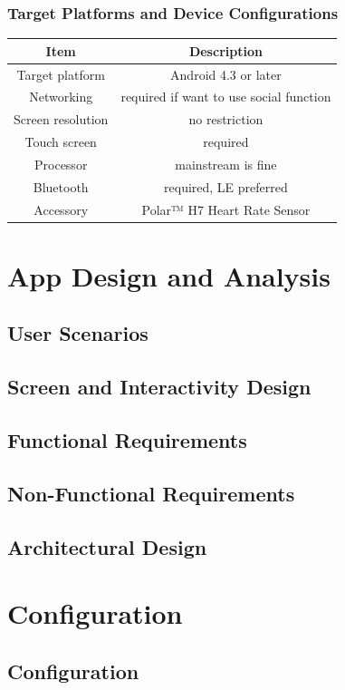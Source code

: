 \documentclass[10pt,a4paper,final,DIV=12]{scrartcl}
\begin{document}
\subsubsection{Target Platforms and Device Configurations}
\begin{tabular}{|c|c|}
\hline 
Item & Description \\ 
\hline 
Target platform & Android 4.3 or later \\
Networking & required if want to use social function \\
Screen resolution & no restriction \\
Touch screen & required \\
Processor & mainstream is fine \\
Bluetooth & required, LE preferred \\
Accessory & Polar™ H7 Heart Rate Sensor \\
\hline 
\end{tabular} 
\section{App Design and Analysis}
\subsection{User Scenarios}
	
\subsection{Screen and Interactivity Design}
	
\subsection{Functional Requirements}
	
\subsection{Non-Functional Requirements}
	
\subsection{Architectural Design}
	

\section{Configuration}
\subsection{Configuration}
	
\end{document}
